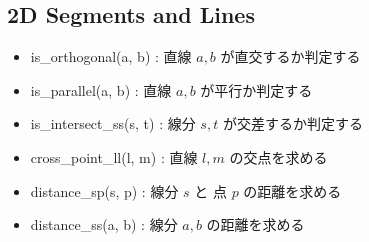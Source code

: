 \subsection{2D Segments and Lines}

\begin{itemize}
	\item is\_orthogonal(a, b) : 直線 $a, b$ が直交するか判定する
	\item is\_parallel(a, b) : 直線 $a, b$ が平行か判定する
	\item is\_intersect\_ss(s, t) : 線分 $s, t$ が交差するか判定する
	\item cross\_point\_ll(l, m) : 直線 $l, m$ の交点を求める
	\item distance\_sp(s, p) : 線分 $s$ と 点 $p$ の距離を求める
	\item distance\_ss(a, b) : 線分 $a, b$ の距離を求める
\end{itemize}

